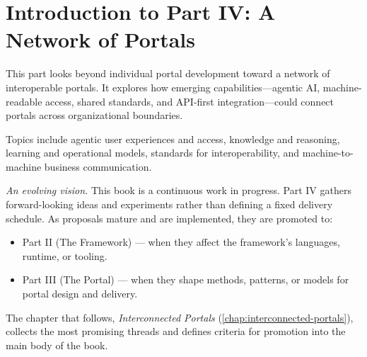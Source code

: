 \chapter*{Introduction to Part IV: A Network of Portals}
\label{part:network-of-portals}

This part looks beyond individual portal development toward a network of interoperable portals. It explores how emerging capabilities---agentic AI, machine-readable access, shared standards, and API-first integration---could connect portals across organizational boundaries.

Topics include agentic user experiences and access, knowledge and reasoning, learning and operational models, standards for interoperability, and machine-to-machine business communication.

\textit{An evolving vision.} This book is a continuous work in progress. Part IV gathers forward-looking ideas and experiments rather than defining a fixed delivery schedule. As proposals mature and are implemented, they are promoted to:
\begin{itemize}
  \item Part II (The Framework) --- when they affect the framework’s languages, runtime, or tooling.
  \item Part III (The Portal) --- when they shape methods, patterns, or models for portal design and delivery.
\end{itemize}

\noindent The chapter that follows, \emph{Interconnected Portals} (\cref{chap:interconnected-portals}), collects the most promising threads and defines criteria for promotion into the main body of the book.

